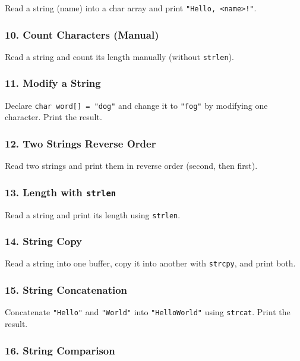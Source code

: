 \documentclass[
  letterpaper,
  DIV=11,
  numbers=noendperiod]{scrreprt}
\begin{document}
Read a string (name) into a char array and print
\texttt{"Hello,\ \textless{}name\textgreater{}!"}.

\subsubsection{10. Count Characters
(Manual)}\label{count-characters-manual}

Read a string and count its length manually (without \texttt{strlen}).

\subsubsection{11. Modify a String}\label{modify-a-string}

Declare \texttt{char\ word{[}{]}\ =\ "dog"} and change it to
\texttt{"fog"} by modifying one character. Print the result.

\subsubsection{12. Two Strings Reverse
Order}\label{two-strings-reverse-order}

Read two strings and print them in reverse order (second, then first).

\subsubsection{\texorpdfstring{13. Length with
\texttt{strlen}}{13. Length with strlen}}\label{length-with-strlen}

Read a string and print its length using \texttt{strlen}.

\subsubsection{14. String Copy}\label{string-copy}

Read a string into one buffer, copy it into another with
\texttt{strcpy}, and print both.

\subsubsection{15. String Concatenation}\label{string-concatenation}

Concatenate \texttt{"Hello"} and \texttt{"World"} into
\texttt{"HelloWorld"} using \texttt{strcat}. Print the result.

\subsubsection{16. String Comparison}\label{string-comparison}
\end{document}
